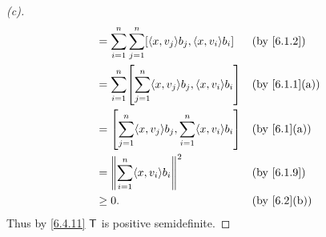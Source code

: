 \begin{proof}[(c)]
\begin{align*}
     & = \sum_{i = 1}^n \sum_{j = 1}^n [\inn{x, v_j} b_j, \inn{x, v_i} b_i]                                   &  & \text{(by \cref{6.1.2})}       \\
     & = \sum_{i = 1}^n \br{\sum_{j = 1}^n \inn{x, v_j} b_j, \inn{x, v_i} b_i}                                &  & \text{(by \cref{6.1.1}(a))}    \\
     & = \br{\sum_{j = 1}^n \inn{x, v_j} b_j, \sum_{i = 1}^n \inn{x, v_i} b_i}                                &  & \text{(by \cref{6.1}(a))}      \\
     & = \norm{\sum_{i = 1}^n \inn{x, v_i} b_i}^2                                                             &  & \text{(by \cref{6.1.9})}       \\
     & \geq 0.                                                                                                &  & \text{(by \cref{6.2}(b))}
  \end{align*}
  Thus by \cref{6.4.11} \(\mathsf{T}\) is positive semidefinite.
\end{proof}

